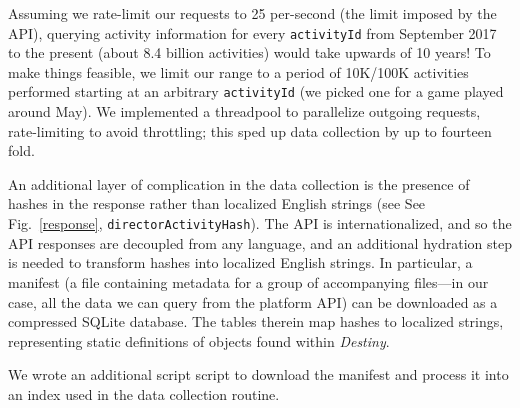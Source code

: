 \documentclass[conference]{IEEEtran}
\begin{document}
Assuming we rate-limit our requests to 25 per-second (the limit imposed by the
API), querying activity information for every \texttt{activityId} from
September 2017 to the present (about 8.4 billion activities) would take upwards
of 10 years! To make things feasible, we limit our range to a period of
10K/100K activities performed starting at an arbitrary \texttt{activityId} (we picked one
for a game played around May).
We implemented a threadpool to parallelize outgoing requests, rate-limiting to
avoid throttling; this sped up data collection by up to fourteen fold.

An additional layer of complication in the data collection is the presence of
hashes in the response rather than localized English strings (see See
Fig.~\ref{response}, \texttt{directorActivityHash}). The API is
internationalized, and so the API responses are decoupled from any language,
and an additional hydration step is needed to transform hashes into localized
English strings. In particular, a manifest (a file containing metadata for a
group of accompanying files—in our case, all the data we can query from the
platform API) can be downloaded as a compressed SQLite database. The tables
therein map hashes to localized strings, representing static definitions of
objects found within \textit{Destiny}.

We wrote an additional script script to download the manifest and process it
into an index used in the data collection routine.
\end{document}
